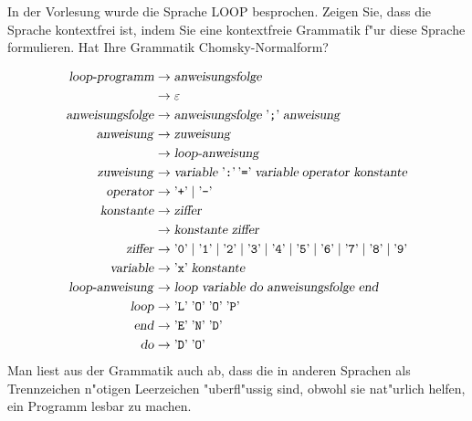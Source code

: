 In der Vorlesung wurde die Sprache LOOP besprochen. Zeigen Sie, dass
die Sprache kontextfrei ist, indem Sie eine
kontextfreie Grammatik f"ur diese Sprache formulieren.
Hat Ihre Grammatik Chomsky-Normalform?

\begin{loesung}
\begin{align*}
\text{\textsl{loop-programm}}&\to\text{\textsl{anweisungsfolge}}\\
&\to\varepsilon\\
\text{\textsl{anweisungsfolge}}
&\to\text{\textsl{anweisungsfolge}}\;\text{'{\tt ;}'}\;
\text{\textsl{anweisung}}
\\
\text{\textsl{anweisung}}
&\to\text{\textsl{zuweisung}}
\\
&\to\text{\textsl{loop-anweisung}}
\\
\text{\textsl{zuweisung}}
&\to
\text{\textsl{variable}}\; \text{'{\tt :}'}\, \text{'{\tt =}'}\;
\textsl{variable}\;\text{\textsl{operator}}\;\text{\textsl{konstante}}
\\
\text{\textsl{operator}}
&\to\text{'{\tt +}'}\;|\;\text{'{\tt -}'}
\\
\text{\textsl{konstante}}&\to\text{\textsl{ziffer}}\\
&\to\text{\textsl{konstante}}\;\text{\textsl{ziffer}}
\\
\text{\textsl{ziffer}}&\to 
\text{'{\tt 0}'}\;|\;
\text{'{\tt 1}'}\;|\;
\text{'{\tt 2}'}\;|\;
\text{'{\tt 3}'}\;|\;
\text{'{\tt 4}'}\;|\;
\text{'{\tt 5}'}\;|\;
\text{'{\tt 6}'}\;|\;
\text{'{\tt 7}'}\;|\;
\text{'{\tt 8}'}\;|\;
\text{'{\tt 9}'}\\
\text{\textsl{variable}}&\to \text{'{\tt x}'}\;\text{\textsl{konstante}}\\
\text{\textsl{loop-anweisung}}&\to
\text{\textsl{loop}}\;
\text{\textsl{variable}}\;
\text{\textsl{do}}\;
\text{\textsl{anweisungsfolge}}\;
\text{\textsl{end}}\\
\text{\textsl{loop}}&\to \text{'{\tt L}'}\; \text{'{\tt O}'}\; \text{'{\tt O}'}\; \text{'{\tt P}'}\\
\text{\textsl{end}}&\to \text{'{\tt E}'}\; \text{'{\tt N}'}\; \text{'{\tt D}'}\\
\text{\textsl{do}}&\to \text{'{\tt D}'}\; \text{'{\tt O}'} \\
\end{align*}
Man liest aus der Grammatik auch ab, dass die in anderen Sprachen als
Trennzeichen n"otigen Leerzeichen "uberfl"ussig sind, obwohl sie nat"urlich
helfen, ein Programm lesbar zu machen.


\end{loesung}
